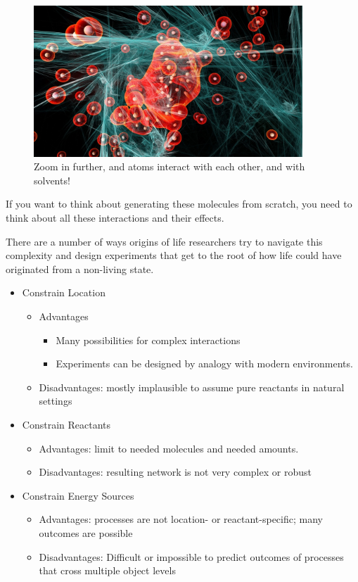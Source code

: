 \documentclass[]{article}
\begin{document}
\begin{figure}[H]
	\begin{center}
		\caption[Zoom in further, and atoms interact with each other]{Zoom in further, and atoms interact with each other, and with solvents!}\label{fig:MolecularInteractions} 
		\includegraphics[width=0.9\textwidth]{MolecularInteractions}
	\end{center}
\end{figure}

If you want to think about generating these molecules from scratch, you need to think about all these interactions and their effects.

There are a number of ways origins of life researchers try to navigate this complexity and design experiments that get to the root of how life could have originated from a non-living state.

\begin{itemize}
	\item Constrain Location 
	\begin{itemize}
		\item Advantages
		\begin{itemize}
			\item Many possibilities for complex interactions
			\item Experiments can be designed by analogy with modern environments.
		\end{itemize}
		\item Disadvantages: mostly implausible to assume pure reactants in natural settings
	\end{itemize}
	\item Constrain Reactants
	\begin{itemize}
		\item Advantages: limit to needed molecules and needed amounts.
		\item Disadvantages: resulting network is not very complex or robust
	\end{itemize}	
	\item Constrain Energy Sources
		\begin{itemize}
		\item Advantages: processes are not location- or reactant-specific; many 		outcomes are possible
		\item Disadvantages: Difficult or impossible to predict outcomes of
		processes that cross multiple object levels
	\end{itemize}
\end{itemize}
\end{document}
